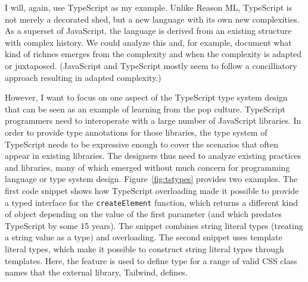 I will, again, use TypeScript as my example. Unlike Reason ML, TypeScript is not merely a decorated
shed, but a new language with its own new complexities. As a superset of JavaScript, the language is
derived from an existing structure with complex history. We could analyze this and, for example,
document what kind of richnes emerges from the complexity and when the complexity is adapted or
juxtaposed. (JavaScript and TypeScript mostly seem to follow a concilliatory approach resulting in
adapted complexity.)

However, I want to focus on one aspect of the TypeScript type system design that can be seen as an
example of learning from the pop culture. TypeScript programmers need to interoperate with a large
number of JavaScript libraries. In order to provide type annotations for those libraries,
the type system of TypeScript needs to be expressive enough to cover the scenarios that often
appear in existing libraries. The designers thus need to analyze existing practices and libraries,
many of which emerged without much concern for programming language or type system design.
Figure~\ref{fig:tstypes} provides two examples. The first code snippet shows how TypeScript
overloading made it possible to provide a typed interface for the \texttt{createElement} function,
which returns a different kind of object depending on the value of the first parameter
(and which predates TypeScript by some 15 years). The snippet combines string literal types
(treating a string value as a type) and overloading.
The second snippet uses template literal types, which make it possible to construct string literal
types through templates. Here, the feature is used to define type for a range of valid CSS class
names that the external library, Tailwind, defines.


